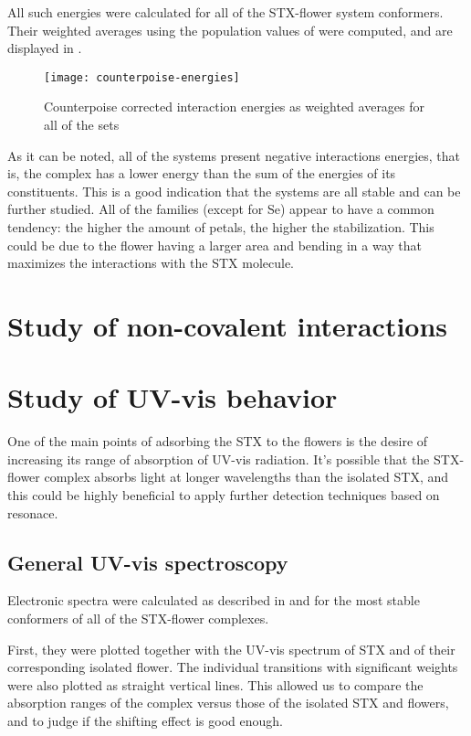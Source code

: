 All such energies were calculated for all of the STX-flower system conformers.
Their weighted averages using the population values of  were computed, and are displayed in .

\begin{figure}
    \texttt{[image: counterpoise-energies]}
    \caption[Counterpoise corrected interaction energies]{Counterpoise corrected interaction energies as weighted averages for all of the sets}
\end{figure}

As it can be noted, all of the systems present negative interactions energies, that is, the complex has a lower energy than the sum of the energies of its constituents.
This is a good indication that the systems are all stable and can be further studied.
All of the families (except for Se) appear to have a common tendency: the higher the amount of petals, the higher the stabilization. This could be due to the flower having a larger area and bending in a way that maximizes the interactions with the STX molecule.

\section{Study of non-covalent interactions}
\blindtext

\section{Study of UV-vis behavior}
One of the main points of adsorbing the STX to the flowers is the desire of increasing its range of absorption of UV-vis radiation.
It's possible that the STX-flower complex absorbs light at longer wavelengths than the isolated STX, and this could be highly beneficial to apply further detection techniques based on resonace.

\subsection{General UV-vis spectroscopy}
Electronic spectra were calculated as described in  and  for the most stable conformers of all of the STX-flower complexes.

First, they were plotted together with the UV-vis spectrum of STX and of their corresponding isolated flower.
The individual transitions with significant weights were also plotted as straight vertical lines.
This allowed us to compare the absorption ranges of the complex versus those of the isolated STX and flowers, and to judge if the shifting effect is good enough.

